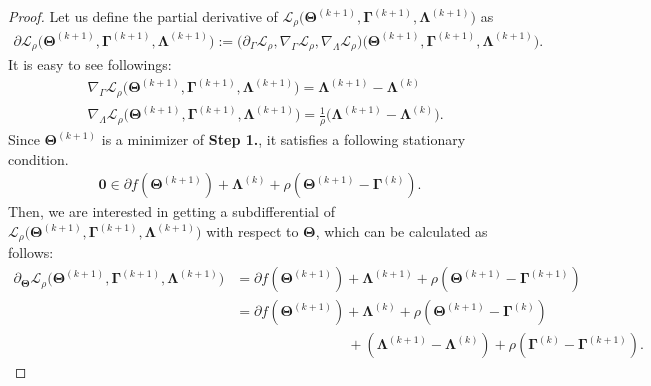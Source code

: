 \documentclass[alpha-refs]{wiley-article}
\begin{document}
\begin{proof}
Let us define the partial derivative of $\mathcal{L}_{\rho} \big( \boldsymbol{\Theta}^{(k+1)},\boldsymbol{\Gamma}^{(k+1)},\boldsymbol{\Lambda}^{(k+1)} \big)$ as
\begin{align*}
    \partial \mathcal{L}_{\rho} \big( \boldsymbol{\Theta}^{(k+1)},\boldsymbol{\Gamma}^{(k+1)},\boldsymbol{\Lambda}^{(k+1)} \big)
    := \big( \partial_{\Gamma} \mathcal{L}_{\rho}, \nabla_{\Gamma} \mathcal{L}_{\rho}, \nabla_{\Lambda} \mathcal{L}_{\rho} \big)\big(\boldsymbol{\Theta}^{(k+1)},\boldsymbol{\Gamma}^{(k+1)},\boldsymbol{\Lambda}^{(k+1)} \big).
\end{align*}
It is easy to see followings:
\begin{align*}
    &\nabla_{\Gamma} \mathcal{L}_{\rho} \big( \boldsymbol{\Theta}^{(k+1)},\boldsymbol{\Gamma}^{(k+1)},\boldsymbol{\Lambda}^{(k+1)} \big)
    = \boldsymbol{\Lambda}^{(k+1)} - \boldsymbol{\Lambda}^{(k)} \\
    &\nabla_{\Lambda} \mathcal{L}_{\rho} \big( \boldsymbol{\Theta}^{(k+1)},\boldsymbol{\Gamma}^{(k+1)},\boldsymbol{\Lambda}^{(k+1)} \big)
    = \frac{1}{\rho} \big( \boldsymbol{\Lambda}^{(k+1)} - \boldsymbol{\Lambda}^{(k)} \big).
\end{align*}
Since $\boldsymbol{\Theta}^{(k+1)}$ is a minimizer of \textbf{Step 1.}, it satisfies a following stationary condition. 
\begin{align} \label{subgradient}
    \boldsymbol{0} \in \partial f(\boldsymbol{\Theta}^{(k+1)}) + \boldsymbol{\Lambda}^{(k)} + \rho (\boldsymbol{\Theta}^{(k+1)} - \boldsymbol{\Gamma}^{(k)}).
\end{align}
Then, we are interested in getting a subdifferential of $\mathcal{L}_{\rho} \big( \boldsymbol{\Theta}^{(k+1)},\boldsymbol{\Gamma}^{(k+1)},\boldsymbol{\Lambda}^{(k+1)} \big)$ with respect to $\boldsymbol{\Theta}$, which can be calculated as follows:
\begin{align*}
    \partial_{\boldsymbol{\Theta}}\mathcal{L}_{\rho} \big( \boldsymbol{\Theta}^{(k+1)},\boldsymbol{\Gamma}^{(k+1)},\boldsymbol{\Lambda}^{(k+1)} \big)
    &= \partial f(\boldsymbol{\Theta}^{(k+1)}) + \boldsymbol{\Lambda}^{(k+1)} + \rho (\boldsymbol{\Theta}^{(k+1)} - \boldsymbol{\Gamma}^{(k+1)}) \\
    &= \partial f(\boldsymbol{\Theta}^{(k+1)}) + \boldsymbol{\Lambda}^{(k)} + \rho (\boldsymbol{\Theta}^{(k+1)} - \boldsymbol{\Gamma}^{(k)}) \\
    &\qquad \qquad \qquad \qquad + (\boldsymbol{\Lambda}^{(k+1)} - \boldsymbol{\Lambda}^{(k)}) + \rho (\boldsymbol{\Gamma}^{(k)} - \boldsymbol{\Gamma}^{(k+1)} ).

\end{align*}
\end{proof}
\end{document}
